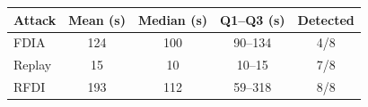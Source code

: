 \begin{tabular}{lcccc}
\toprule
Attack & Mean (s) & Median (s) & Q1--Q3 (s) & Detected \\
\midrule
FDIA & 124 & 100 & 90--134 & 4/8 \\
Replay & 15 & 10 & 10--15 & 7/8 \\
RFDI & 193 & 112 & 59--318 & 8/8 \\
\bottomrule
\end{tabular}
